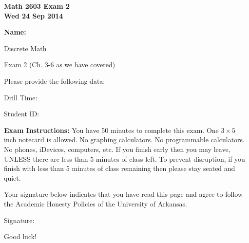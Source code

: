 \documentclass[12pt,letterpaper]{article}
\begin{document}
\flushleft
\begin{multicols}{2}

\begin{large}\textbf{Math 2603 Exam 2 \\
Wed 24 Sep 2014}\end{large}

\hfill\textbf{Name:  }\underline{\hspace{35ex}} %
\\
\vspace{.5in}

\end{multicols}

\pagestyle{empty}

\vspace{4pc}

\begin{center}\LARGE Discrete Math

Exam 2 (Ch. 3-6 as we have covered) \end{center}

\vspace{2pc}
Please provide the following data:

\vspace{2pc}
Drill Time: \underline{\hspace{40ex}}

\vspace{2pc}
Student ID: \underline{\hspace{40ex}}

\vspace{3pc}
{\bf Exam Instructions:} You have 50 minutes to complete this exam.  One $3\times 5$ inch notecard is allowed.  No graphing calculators.  No programmable calculators.  No phones, iDevices, computers, etc.  If you finish early then you may leave, UNLESS there are less than 5 minutes of class left.  To prevent disruption, if you finish with less than 5 minutes of class remaining then please stay seated and quiet.

\vspace{5pc}
Your signature below indicates that you have read this page and agree to follow the Academic Honesty Policies of the University of Arkansas.  

\vspace{3pc}
Signature: \underline{\hspace{80ex}}

\vfill
\begin{flushright}\Large Good luck!\end{flushright}
\end{document}
